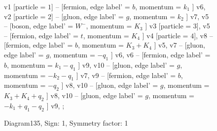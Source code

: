 \documentclass{revtex4}
\begin{document}
\begin{figure}[!htb]
\begin{center}
{v1 [particle = \(1\)] -- [fermion, edge label' = \(b\), momentum = \(k_{1}\) ] v6, 
v2 [particle = \(2\)] -- [gluon, edge label' = \(g\), momentum = \(k_{2}\) ] v7, 
v5 -- [boson, edge label' = \(W^{-}\), momentum = \(K_{3}\) ] v3 [particle = \(3\)], 
v5 -- [fermion, edge label' = \(t\), momentum = \(K_{4}\) ] v4 [particle = \(4\)], 
v8 -- [fermion, edge label' = \(b\), momentum = \(K_{3} + K_{4}\) ] v5, 
v7 -- [gluon, edge label' = \(g\), momentum = \(-q_{1}\) ] v6, 
v6 -- [fermion, edge label' = \(b\), momentum = \(k_{1} - q_{1}\) ] v9, 
v10 -- [gluon, edge label' = \(g\), momentum = \(-k_{2} - q_{1}\) ] v7, 
v9 -- [fermion, edge label' = \(b\), momentum = \(-q_{2}\) ] v8, 
v10 -- [gluon, edge label' = \(g\), momentum = \(K_{3} + K_{4} + q_{2}\) ] v8, 
v10 -- [gluon, edge label' = \(g\), momentum = \(-k_{1} + q_{1} - q_{2}\) ] v9, 
};
\end{center}
\caption{Diagram135, Sign: 1, Symmetry factor: 1}
\end{figure}
\newpage
\end{document}

